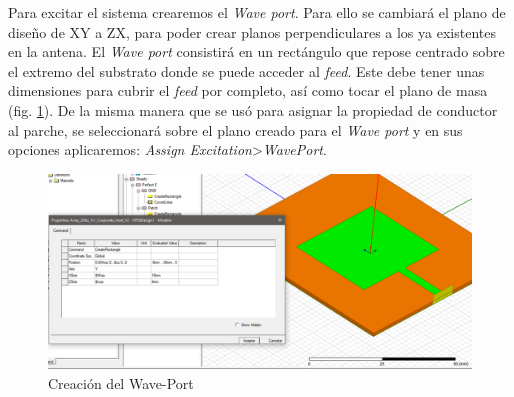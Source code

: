 \par Para excitar el sistema crearemos el \textit{Wave port}. Para ello se cambiará el plano de diseño de XY a ZX, para poder crear planos perpendiculares a los ya existentes en la antena. El \textit{Wave port} consistirá en un rectángulo que repose centrado sobre el extremo del substrato donde se puede acceder al \textit{feed}. Este debe tener unas dimensiones para cubrir el \textit{feed} por completo, así como tocar el plano de masa (fig. \ref{fig:waveport}). De la misma manera que se usó para asignar la propiedad de conductor al parche, se seleccionará sobre el plano creado para el \textit{Wave port} y en sus opciones aplicaremos: \textit{Assign Excitation}>\textit{WavePort}. 
\\

\begin{figure}[p]
    \centering
        \includegraphics[width=\textwidth]{archivos/desarrollo/6}
        \caption{Creación del Wave-Port}
        \label{fig:waveport}
\end{figure}

